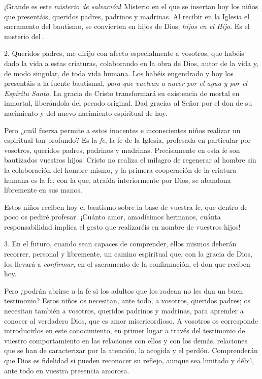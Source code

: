 \begin{body}
\begin{body}
{¡Grande es este \emph{misterio de salvación}! Misterio en el que se insertan hoy los niños que presentáis, queridos padres, padrinos y madrinas. Al recibir en la Iglesia el sacramento del bautismo, se convierten en hijos de Dios, \emph{hijos en el Hijo}. Es el misterio del .

2. Queridos padres, me dirijo con afecto especialmente a vosotros, que habéis dado la vida a estas criaturas, colaborando en la obra de Dios, autor de la vida y, de modo singular, de toda vida humana. Los habéis engendrado y hoy los presentáis a la fuente bautismal, \emph{para que vuelvan a nacer por el agua y por el Espíritu Santo}. La gracia de Cristo transformará su existencia de mortal en inmortal, liberándola del pecado original. Dad gracias al Señor por el don de su nacimiento y del nuevo nacimiento espiritual de hoy.

Pero ¿cuál fuerza permite a estos inocentes e inconscientes niños realizar un  espiritual tan profundo? Es la \emph{fe}, la fe de la Iglesia, profesada en particular por vosotros, queridos padres, padrinos y madrinas. Precisamente en esta fe son bautizados vuestros hijos. Cristo no realiza el milagro de regenerar al hombre sin la colaboración del hombre mismo, y la primera cooperación de la criatura humana es la fe, con la que, atraída interiormente por Dios, se abandona libremente en sus manos.

Estos niños reciben hoy el bautismo sobre la base de vuestra fe, que dentro de poco os pediré profesar. ¡Cuánto amor, amadísimos hermanos, cuánta responsabilidad implica el gesto que realizaréis en nombre de vuestros hijos!

3. En el futuro, cuando sean capaces de comprender, ellos mismos deberán recorrer, personal y libremente, un camino espiritual que, con la gracia de Dios, los llevará a \emph{confirmar}, en el sacramento de la confirmación, el don que reciben hoy.

Pero ¿podrán abrirse a la fe si los adultos que los rodean no les dan un buen testimonio? Estos niños os necesitan, ante todo, a vosotros, queridos padres; os necesitan también a vosotros, queridos padrinos y madrinas, para aprender a conocer al verdadero Dios, que es amor misericordioso. A vosotros os corresponde introducirlos en este conocimiento, en primer lugar a través del testimonio de vuestro comportamiento en las relaciones con ellos y con los demás, relaciones que se han de caracterizar por la atención, la acogida y el perdón. Comprenderán que Dios es fidelidad si pueden reconocer su reflejo, aunque sea limitado y débil, ante todo en vuestra presencia amorosa.

}
\end{body}
\end{body}
